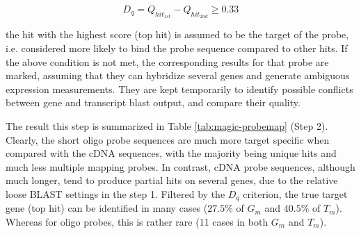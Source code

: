 \begin{equation}
D_q = Q_{hit_{1st}} - Q_{hit_{2nd}} \geq 0.33
\end{equation}

the hit with the highest score (top hit) is assumed to be the target of the 
probe, i.e. considered more likely to bind the probe sequence compared to other 
hits. 
If the above condition is not met, the corresponding results for that 
probe are marked, assuming that they can hybridize several genes and generate 
ambiguous expression measurements. 
They are kept temporarily to identify possible conflicts between gene and 
transcript blast output, and compare their quality. 

The result this step is summarized in Table \ref{tab:magic-probemap} (Step 2). 
Clearly, the short oligo probe sequences are much more target specific when 
compared with the cDNA sequences, with the majority being unique hits and much 
less multiple mapping probes.
In contrast, cDNA probe sequences, although much longer, tend to produce 
partial hits on several genes, due to the relative loose BLAST settings in the 
step 1. 
Filtered by the $D_q$ criterion, the true target gene (top hit) can be 
identified in many cases ($27.5\%$ of $G_m$ and $40.5\%$ of $T_m$).
Whereas for oligo probes, this is rather rare (11 cases in both $G_m$ and 
$T_m$).


